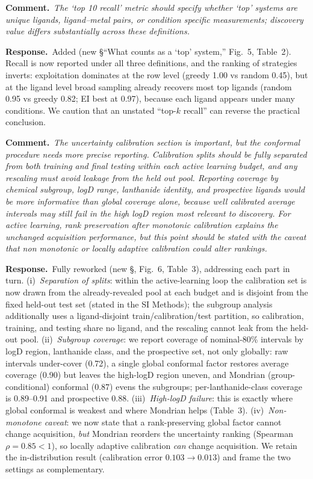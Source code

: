 \documentclass[11pt]{article}
\newcommand{\rev}[1]{\begingroup\itshape\color{gray}#1\endgroup}
\newcommand{\resp}{\par\noindent\textbf{Response.}\ }
\newcommand{\cmt}[1]{\par\vspace{4pt}\noindent\textbf{Comment.}\ \rev{#1}\par\vspace{2pt}}
\begin{document}
\cmt{The `top 10 recall' metric should specify whether `top' systems are unique ligands,
ligand--metal pairs, or condition specific measurements; discovery value differs
substantially across these definitions.}
\resp Added (new \S``What counts as a `top' system,'' Fig.~5, Table~2). Recall is now
reported under all three definitions, and the ranking of strategies inverts:
exploitation dominates at the row level (greedy 1.00 vs random 0.45), but at the ligand
level broad sampling already recovers most top ligands (random 0.95 vs greedy 0.82; EI
best at 0.97), because each ligand appears under many conditions. We caution that an
unstated ``top-$k$ recall'' can reverse the practical conclusion.

\cmt{The uncertainty calibration section is important, but the conformal procedure needs
more precise reporting. Calibration splits should be fully separated from both training
and final testing within each active learning budget, and any rescaling must avoid
leakage from the held out pool. Reporting coverage by chemical subgroup, logD range,
lanthanide identity, and prospective ligands would be more informative than global
coverage alone, because well calibrated average intervals may still fail in the high
logD region most relevant to discovery. For active learning, rank preservation after
monotonic calibration explains the unchanged acquisition performance, but this point
should be stated with the caveat that non monotonic or locally adaptive calibration
could alter rankings.}
\resp Fully reworked (new \S, Fig.~6, Table~3), addressing each part in turn.
(i)~\emph{Separation of splits}: within the active-learning loop the calibration set is
now drawn from the already-revealed pool at each budget and is disjoint from the fixed
held-out test set (stated in the SI Methods); the subgroup analysis additionally uses a
ligand-disjoint train/calibration/test partition, so calibration, training, and testing
share no ligand, and the rescaling cannot leak from the held-out pool.
(ii)~\emph{Subgroup coverage}: we report coverage of nominal-80\% intervals by logD
region, lanthanide class, and the prospective set, not only globally: raw intervals
under-cover (0.72), a single global conformal factor restores average coverage (0.90)
but leaves the high-logD region uneven, and Mondrian (group-conditional) conformal
(0.87) evens the subgroups; per-lanthanide-class coverage is 0.89--0.91 and prospective
0.88. (iii)~\emph{High-logD failure}: this is exactly where global conformal is weakest
and where Mondrian helps (Table~3). (iv)~\emph{Non-monotone caveat}: we now state that
a rank-preserving global factor cannot change acquisition, \emph{but} Mondrian reorders
the uncertainty ranking (Spearman $\rho=0.85<1$), so locally adaptive calibration
\emph{can} change acquisition. We retain the in-distribution result (calibration error
$0.103\!\to\!0.013$) and frame the two settings as complementary.
\end{document}

